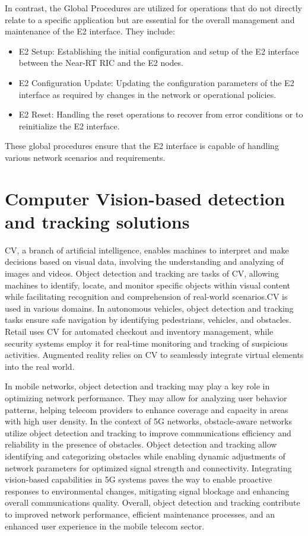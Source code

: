 In contrast, the Global Procedures are utilized for operations that do not directly relate to a specific application but are essential for the overall management and maintenance of the E2 interface.
They include:

\begin{itemize}
\item E2 Setup: Establishing the initial configuration and setup of the E2 interface between the Near-RT RIC and the E2 nodes.
\item E2 Configuration Update: Updating the configuration parameters of the E2 interface as required by changes in the network or operational policies.
\item E2 Reset: Handling the reset operations to recover from error conditions or to reinitialize the E2 interface.
\end{itemize}
These global procedures ensure that the E2 interface is capable of handling various network scenarios and requirements.



\section{Computer Vision-based detection and tracking solutions}\label{sec:CV}

CV, a branch of artificial intelligence, enables machines to interpret and make decisions based on visual data, involving the understanding and analyzing of images and videos. Object detection and tracking are tasks of CV, allowing machines to identify, locate, and monitor specific objects within visual content while facilitating recognition and comprehension of real-world scenarios.CV is used in various domains. In autonomous vehicles, object detection and tracking tasks ensure safe navigation by identifying pedestrians, vehicles, and obstacles. Retail uses CV for automated checkout and inventory management, while security systems employ it for real-time monitoring and tracking of suspicious activities. Augmented reality relies on CV to seamlessly integrate virtual elements into the real world.

In mobile networks, object detection and tracking may play a key role in optimizing network performance. They may allow for analyzing user behavior patterns, helping telecom providers to enhance coverage and capacity in areas with high user density. In the context of 5G networks, obstacle-aware networks utilize object detection and tracking to improve communications efficiency and reliability in the presence of obstacles. Object detection and tracking allow identifying and categorizing obstacles while enabling dynamic adjustments of network parameters for optimized signal strength and connectivity. Integrating vision-based capabilities in 5G systems paves the way to enable proactive responses to environmental changes, mitigating signal blockage and enhancing overall communications quality. Overall, object detection and tracking contribute to improved network performance, efficient maintenance processes, and an enhanced user experience in the mobile telecom sector.

